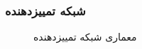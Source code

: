 \subsubsection{شبکه تمییز‌دهنده}
\begin{figure}[H]
	\caption{معماری شبکه تمییزدهنده}
	\label{desc_arch}
\end{figure}

\newpage

